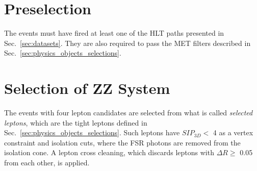 \section{Preselection}
The events must have fired at least one of the HLT paths presented in Sec.~\ref{sec:datasets}. They are also required to pass the MET filters described in Sec.~\ref{sec:physics_objects_selections}.

\section{Selection of ZZ System}
The events with four lepton candidates are selected from what is called \textit{selected leptons}, which are the tight leptons defined in Sec.~\ref{sec:physics_objects_selections}. Such leptons have $SIP_{3D} <$ 4 as a vertex constraint and isolation cuts, where the FSR photons are removed from the isolation cone. A lepton cross cleaning, which discards leptons with $\Delta R \geq$ 0.05 from each other, is applied.

